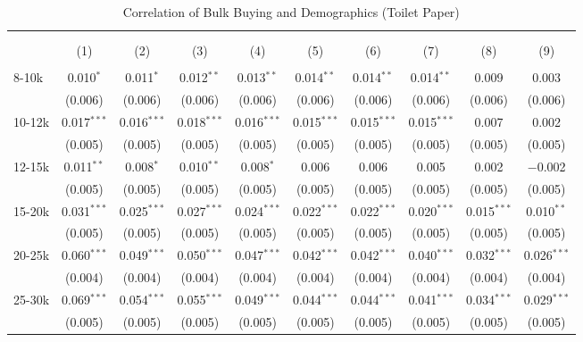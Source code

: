 
\begin{table}[!htbp] \centering 
  \caption{Correlation of Bulk Buying and Demographics (Toilet Paper)} 
  \label{tab:discountingBehavior7260} 
\begin{tabular}{@{\extracolsep{5pt}}lccccccccc} 
\\[-1.8ex]\hline 
\hline \\[-1.8ex] 
\\[-1.8ex] & (1) & (2) & (3) & (4) & (5) & (6) & (7) & (8) & (9)\\ 
\hline \\[-1.8ex] 
 8-10k & 0.010$^{*}$ & 0.011$^{*}$ & 0.012$^{**}$ & 0.013$^{**}$ & 0.014$^{**}$ & 0.014$^{**}$ & 0.014$^{**}$ & 0.009 & 0.003 \\ 
  & (0.006) & (0.006) & (0.006) & (0.006) & (0.006) & (0.006) & (0.006) & (0.006) & (0.006) \\ 
  10-12k & 0.017$^{***}$ & 0.016$^{***}$ & 0.018$^{***}$ & 0.016$^{***}$ & 0.015$^{***}$ & 0.015$^{***}$ & 0.015$^{***}$ & 0.007 & 0.002 \\ 
  & (0.005) & (0.005) & (0.005) & (0.005) & (0.005) & (0.005) & (0.005) & (0.005) & (0.005) \\ 
  12-15k & 0.011$^{**}$ & 0.008$^{*}$ & 0.010$^{**}$ & 0.008$^{*}$ & 0.006 & 0.006 & 0.005 & 0.002 & $-$0.002 \\ 
  & (0.005) & (0.005) & (0.005) & (0.005) & (0.005) & (0.005) & (0.005) & (0.005) & (0.005) \\ 
  15-20k & 0.031$^{***}$ & 0.025$^{***}$ & 0.027$^{***}$ & 0.024$^{***}$ & 0.022$^{***}$ & 0.022$^{***}$ & 0.020$^{***}$ & 0.015$^{***}$ & 0.010$^{**}$ \\ 
  & (0.005) & (0.005) & (0.005) & (0.005) & (0.005) & (0.005) & (0.005) & (0.005) & (0.005) \\ 
  20-25k & 0.060$^{***}$ & 0.049$^{***}$ & 0.050$^{***}$ & 0.047$^{***}$ & 0.042$^{***}$ & 0.042$^{***}$ & 0.040$^{***}$ & 0.032$^{***}$ & 0.026$^{***}$ \\ 
  & (0.004) & (0.004) & (0.004) & (0.004) & (0.004) & (0.004) & (0.004) & (0.004) & (0.004) \\ 
  25-30k & 0.069$^{***}$ & 0.054$^{***}$ & 0.055$^{***}$ & 0.049$^{***}$ & 0.044$^{***}$ & 0.044$^{***}$ & 0.041$^{***}$ & 0.034$^{***}$ & 0.029$^{***}$ \\ 
  & (0.005) & (0.005) & (0.005) & (0.005) & (0.005) & (0.005) & (0.005) & (0.005) & (0.005) \\ 

\end{tabular}
\end{table}
